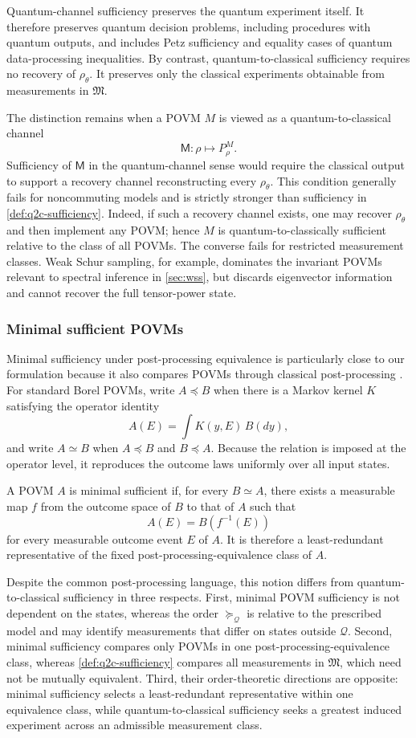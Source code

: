\documentclass{article}
\theoremstyle{named}
\theoremstyle{named1}
\newcommand{\cQ}{\mathcal Q}
\theoremstyle{plain}
\theoremstyle{remark}
\begin{document}
Quantum-channel sufficiency preserves the quantum experiment itself. It
therefore preserves quantum decision problems, including procedures with
quantum outputs, and includes Petz sufficiency and equality cases of quantum
data-processing inequalities. By contrast, quantum-to-classical
sufficiency requires no recovery of $\rho_\theta$. It preserves only the
classical experiments obtainable from measurements in $\mathfrak M$.

The distinction remains when a POVM $M$ is viewed as a
quantum-to-classical channel
\[
    \mathsf M:\rho\longmapsto P_\rho^M.
\]
Sufficiency of $\mathsf M$ in the quantum-channel sense would require the
classical output to support a recovery channel reconstructing every
$\rho_\theta$. This condition generally fails for noncommuting models and
is strictly stronger than sufficiency in
\cref{def:q2c-sufficiency}. Indeed, if such a recovery channel exists, one
may recover $\rho_\theta$ and then implement any POVM; hence $M$ is
quantum-to-classically sufficient relative to the class of all POVMs. The
converse fails for restricted measurement classes. Weak Schur sampling, for
example, dominates the invariant POVMs relevant to spectral inference in
\cref{sec:wss}, but discards eigenvector information and cannot recover the
full tensor-power state.

\subsubsection{Minimal sufficient POVMs}

Minimal sufficiency under post-processing equivalence is particularly close
to our formulation because it also compares POVMs through classical
post-processing \cite{Kuramochi2015,Kuramochi2017}. For standard Borel
POVMs, write $A\preceq B$ when there is a Markov kernel $K$ satisfying the
operator identity
\[
    A(E)=\int K(y,E)\,B(dy),
\]
and write $A\simeq B$ when $A\preceq B$ and $B\preceq A$. Because the
relation is imposed at the operator level, it reproduces the outcome laws
uniformly over all input states.


A POVM $A$ is minimal sufficient if, for every $B\simeq A$, there
exists a measurable map $f$ from the outcome space of $B$ to that of
$A$ such that
\[
A(E)=B(f^{-1}(E))
\]
for every measurable outcome event $E$ of $A$.
It is therefore a least-redundant representative of the fixed
post-processing-equivalence class of $A$.

Despite the common post-processing language, this notion differs from
quantum-to-classical sufficiency in three respects. First, minimal POVM
sufficiency is not dependent on the states, whereas the order $\succeq_{\cQ}$ is relative
to the prescribed model and may identify measurements that differ on
states outside $\cQ$. Second, minimal sufficiency compares only POVMs in
one post-processing-equivalence class, whereas
\cref{def:q2c-sufficiency} compares all measurements in $\mathfrak M$,
which need not be mutually equivalent. Third, their order-theoretic
directions are opposite: minimal sufficiency selects a least-redundant
representative within one equivalence class, while quantum-to-classical
sufficiency seeks a greatest induced experiment across an admissible
measurement class.
\end{document}
